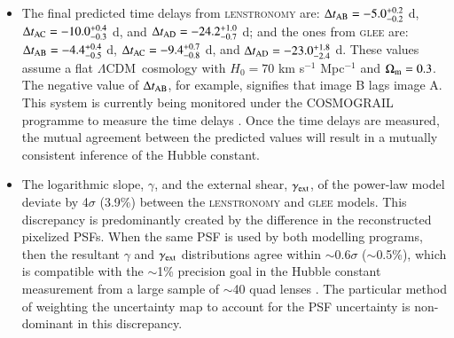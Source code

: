\documentclass[longauth]{aa}
\newcommand{\lcdm}{$\Lambda$CDM}
\newcommand{\ajsiii}[1]{{{#1}}}
\newcommand{\ajsiv}[1]{{{#1}}}
\newcommand{\kw}[1]{{{#1}}}
\newcommand{\suyu}[1]{{{#1}}}
\begin{document}
\begin{itemize}
        \item The final predicted time delays from \textsc{lenstronomy} are: $\Delta t_{ \rm AB } = -5.0^{ +0.2 }_{ -0.2 }$ d,
$\Delta t_{ \rm AC } = -10.0^{ +0.4 }_{ -0.3 }$ d, and
$\Delta t_{ \rm AD } = -24.2^{ +1.0 }_{ -0.7 }$ d; and the ones from \textsc{glee} are: $\Delta t_{ \rm AB } = -4.4^{ +0.4 }_{ -0.5}$ d,
$\Delta t_{ \rm AC } = -9.4^{ +0.7 }_{ -0.8 }$ d, and
$\Delta t_{ \rm AD } = -23.0^{ +1.8 }_{ -2.4 }$ d. These values assume a flat \lcdm\ cosmology with $H_0 = 70$ km s$^{-1}$ Mpc$^{-1}$ and $\Omega_{\rm m} = 0.3$. The negative value of $\Delta t_{\rm AB}$, for example, signifies that image B lags image A. \ajsiii{This system is currently being monitored under the COSMOGRAIL programme to measure the time delays \citep{Eigenbrod05}}. \ajsiv{Once the time delays are measured, the mutual agreement between the predicted values will result in a mutually consistent inference of the Hubble constant.} %
        
        \item The logarithmic slope, $\gamma$, and \ajsiv{the external shear, $\gamma_{\rm ext}$, of the power-law model deviate} by 4$\sigma$ (3.9\%) between the \textsc{lenstronomy} and \textsc{glee} models. This discrepancy is predominantly created by the difference in the reconstructed pixelized PSFs. When the same PSF is used by both modelling programs, then the resultant $\gamma$ \ajsiv{and $\gamma_{\rm ext}$} distributions agree within $\sim$0.6$\sigma$ ($\sim$0.5\%), which is compatible with the $\sim$1\% precision goal in the Hubble constant measurement from a large sample of $\sim$40 quad lenses \citep[e.g.][]{Shajib18, Birrer21c}. %
        The particular method \ajsiii{of weighting the uncertainty map to account for the PSF uncertainty} is non-dominant in this discrepancy. %
        

\end{itemize}
\end{document}
